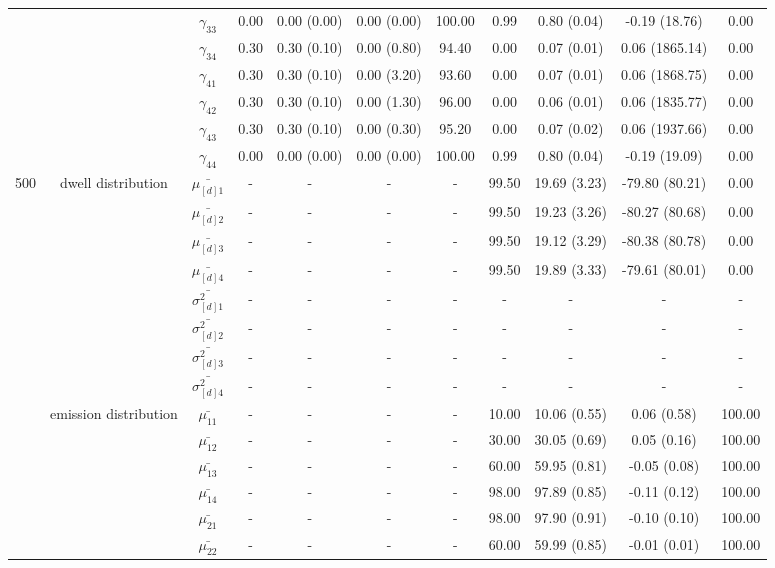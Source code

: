 \begin{table}[h]
{\begin{tabular}{ccccccccccc}
 &  & $\gamma_{33}$ & 0.00 & 0.00 (0.00) & 0.00 (0.00) & 100.00 & 0.99 & 0.80 (0.04) & -0.19 (18.76) & 0.00 \\
 &  & $\gamma_{34}$ & 0.30 & 0.30 (0.10) & 0.00 (0.80) & 94.40 & 0.00 & 0.07 (0.01) & 0.06 (1865.14) & 0.00 \\
 &  & $\gamma_{41}$ & 0.30 & 0.30 (0.10) & 0.00 (3.20) & 93.60 & 0.00 & 0.07 (0.01) & 0.06 (1868.75) & 0.00 \\
 &  & $\gamma_{42}$ & 0.30 & 0.30 (0.10) & 0.00 (1.30) & 96.00 & 0.00 & 0.06 (0.01) & 0.06 (1835.77) & 0.00 \\
 &  & $\gamma_{43}$ & 0.30 & 0.30 (0.10) & 0.00 (0.30) & 95.20 & 0.00 & 0.07 (0.02) & 0.06 (1937.66) & 0.00 \\
 &  & $\gamma_{44}$ & 0.00 & 0.00 (0.00) & 0.00 (0.00) & 100.00 & 0.99 & 0.80 (0.04) & -0.19 (19.09) & 0.00 \\ \midrule
500 & dwell distribution & $\bar{\mu_{[d]1}}$ & - & - & - & - & 99.50 & 19.69 (3.23) & -79.80 (80.21) & 0.00 \\
\multirow{39}{*}{} & \multirow{7}{*}{} & $\bar{\mu_{[d]2}}$ & - & - & - & - & 99.50 & 19.23 (3.26) & -80.27 (80.68) & 0.00 \\
 &  & $\bar{\mu_{[d]3}}$ & - & - & - & - & 99.50 & 19.12 (3.29) & -80.38 (80.78) & 0.00 \\
 &  & $\bar{\mu_{[d]4}}$ & - & - & - & - & 99.50 & 19.89 (3.33) & -79.61 (80.01) & 0.00 \\
 &  & $\bar{\sigma^2_{[d]1}}$ & - & - & - & - & - & - & - & - \\
 &  & $\bar{\sigma^2_{[d]2}}$ & - & - & - & - & - & - & - & - \\
 &  & $\bar{\sigma^2_{[d]3}}$ & - & - & - & - & - & - & - & - \\
 &  & $\bar{\sigma^2_{[d]4}}$ & - & - & - & - & - & - & - & - \\
 & emission distribution & $\bar{\mu_{11}}$ & - & - & - & - & 10.00 & 10.06 (0.55) & 0.06 (0.58) & 100.00 \\
 & \multirow{15}{*}{} & $\bar{\mu_{12}}$ & - & - & - & - & 30.00 & 30.05 (0.69) & 0.05 (0.16) & 100.00 \\
 &  & $\bar{\mu_{13}}$ & - & - & - & - & 60.00 & 59.95 (0.81) & -0.05 (0.08) & 100.00 \\
 &  & $\bar{\mu_{14}}$ & - & - & - & - & 98.00 & 97.89 (0.85) & -0.11 (0.12) & 100.00 \\
 &  & $\bar{\mu_{21}}$ & - & - & - & - & 98.00 & 97.90 (0.91) & -0.10 (0.10) & 100.00 \\
 &  & $\bar{\mu_{22}}$ & - & - & - & - & 60.00 & 59.99 (0.85) & -0.01 (0.01) & 100.00 \\

\end{tabular}}
\end{table}
